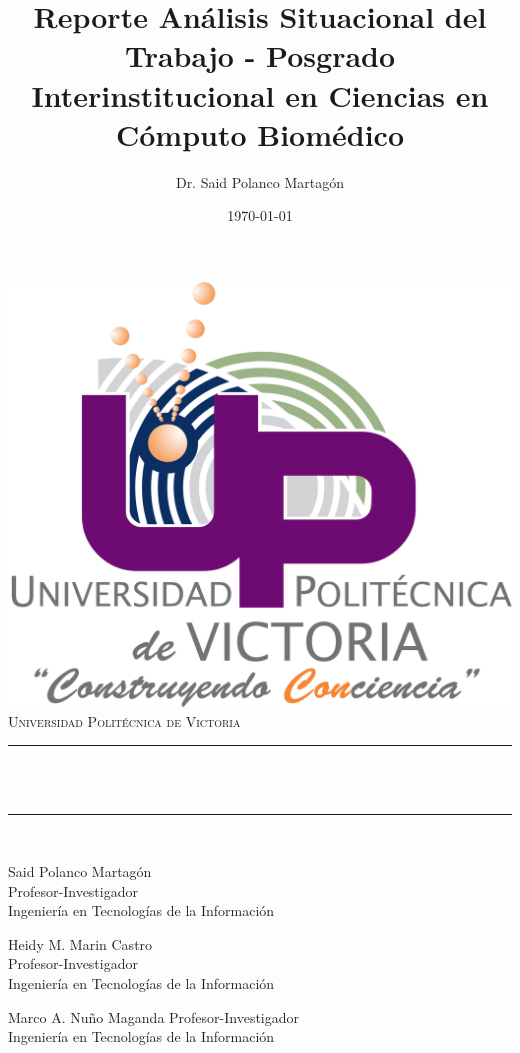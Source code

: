 \documentclass[11pt,letterpaper,twoside]{report}
\author{Dr. Said Polanco Martagón}
\title{Reporte Análisis Situacional del Trabajo - Posgrado Interinstitucional en Ciencias en Cómputo Biomédico }
\date{\today}
\makeatletter
\let\thetitle\@title
\makeatother
\begin{document}
	
	\begin{titlepage}
		\centering
		\vspace*{0.5 cm}
		\includegraphics[scale = 0.5]{logo_UPV.png}\\[1.0 cm]
		\textsc{\LARGE Universidad Politécnica de Victoria}\\[2.0 cm]  %
		\rule{\linewidth}{0.2 mm} \\[0.4 cm]
		{ \huge \bfseries \thetitle}\\
		\rule{\linewidth}{0.2 mm} \\[1.5 cm]
		
		\begin{minipage}{0.3\textwidth}
			\begin{center} \large
				Said Polanco Martagón\\
				Profesor-Investigador\\
				Ingeniería en Tecnologías de la Información\\
			\end{center}
		\end{minipage}
		\begin{minipage}{0.3\textwidth}
			\begin{center} \large
				Heidy M. Marin Castro\\
				Profesor-Investigador\\
				Ingeniería en Tecnologías de la Información\\
			\end{center}
		\end{minipage}
		\begin{minipage}{0.3\textwidth}
			
			\begin{center} \large
				Marco A. Nuño Maganda
				Profesor-Investigador\\
				Ingeniería en Tecnologías de la Información\\
			\end{center}
			
		\end{minipage}\\[2 cm]
		
	\end{titlepage}
	
\end{document}
